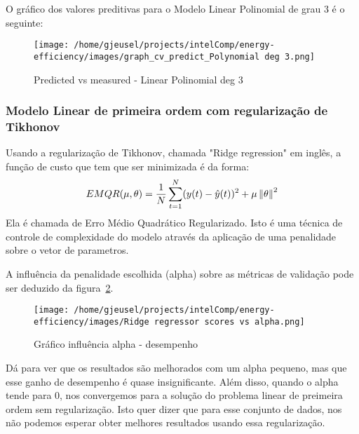 \documentclass[paper=a4, fontsize=11pt]{article} %
\numberwithin{equation}{section} %
\numberwithin{figure}{section} %
\numberwithin{table}{section} %
\begin{document}
O gráfico dos valores preditivas para o Modelo Linear Polinomial de grau 3 é o seguinte:
\begin{figure}[H] %
\begin{center}
\texttt{[image: /home/gjeusel/projects/intelComp/energy-efficiency/images/graph\_cv\_predict\_Polynomial deg 3.png]}
\end{center}
\caption{Predicted vs measured - Linear Polinomial deg 3}
\label{PvsM_Linear_Polinomial_deg3}
\end{figure}


\subsubsection{Modelo Linear de primeira ordem com regularização de Tikhonov}
Usando a regularização de Tikhonov, chamada "Ridge regression" em inglês, a função de custo que tem que ser minimizada é da forma:
\begin{equation}
EMQR({\mu},{\theta}) = \frac{1}{N}\sum_{t=1}^{N} (y(t) - \hat{y}(t))^{2} + {\mu}\left\Vert {\theta}\right\Vert^{2}
\end{equation}
Ela é chamada de Erro Médio Quadrático Regularizado.
Isto é uma técnica de controle de complexidade do modelo através da aplicação de uma penalidade sobre o vetor de parametros.

A influência da penalidade escolhida (alpha) sobre as métricas de validação pode ser deduzido da figura~\ref{graph_inf_alpha}.\newline

\begin{figure}[H] %
\begin{center}
\texttt{[image: /home/gjeusel/projects/intelComp/energy-efficiency/images/Ridge regressor scores vs alpha.png]}
\caption{Gráfico influência alpha - desempenho}
\label{graph_inf_alpha}
\end{center}
\end{figure}

Dá para ver que os resultados são melhorados com um alpha pequeno, mas que esse ganho de desempenho é quase insignificante.
Além disso, quando o alpha tende para 0, nos convergemos para a solução do problema linear de preimeira ordem sem regularização.
Isto quer dizer que para esse conjunto de dados, nos não podemos esperar obter melhores resultados usando essa regularização.
\end{document}
